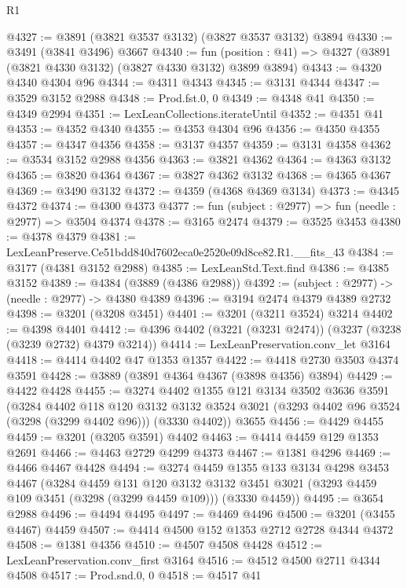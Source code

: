 \begin{lexlean}{R1}
\begin{coremodule}
@4327 := @3891 (@3821 @3537 @3132) (@3827 @3537 @3132) @3894
@4330 := @3491 (@3841 @3496) @3667
@4340 := fun (position : @41) => @4327 (@3891 (@3821 @4330 @3132) (@3827 @4330 @3132) @3899 @3894)
@4343 := @4320 @4340 @4304 @96
@4344 := @4311 @4343
@4345 := @3131 @4344
@4347 := @3529 @3152 @2988
@4348 := Prod.fst.{0, 0}
@4349 := @4348 @41
@4350 := @4349 @2994
@4351 := LexLeanCollections.iterateUntil
@4352 := @4351 @41
@4353 := @4352 @4340
@4355 := @4353 @4304 @96
@4356 := @4350 @4355
@4357 := @4347 @4356
@4358 := @3137 @4357
@4359 := @3131 @4358
@4362 := @3534 @3152 @2988 @4356
@4363 := @3821 @4362
@4364 := @4363 @3132
@4365 := @3820 @4364
@4367 := @3827 @4362 @3132
@4368 := @4365 @4367
@4369 := @3490 @3132
@4372 := @4359 (@4368 @4369 @3134)
@4373 := @4345 @4372
@4374 := @4300 @4373
@4377 := fun (subject : @2977) => fun (needle : @2977) => @3504 @4374
@4378 := @3165 @2474
@4379 := @3525 @3453
@4380 := @4378 @4379
@4381 := LexLeanPreserve.Ce51bdd840d7602eca0e2520e09d8ce82.R1.__fits_43
@4384 := @3177 (@4381 @3152 @2988)
@4385 := LexLeanStd.Text.find
@4386 := @4385 @3152
@4389 := @4384 (@3889 (@4386 @2988))
@4392 := (subject : @2977) -> (needle : @2977) -> @4380 @4389
@4396 := @3194 @2474 @4379 @4389 @2732
@4398 := @3201 (@3208 @3451)
@4401 := @3201 (@3211 @3524) @3214
@4402 := @4398 @4401
@4412 := @4396 @4402 (@3221 (@3231 @2474)) (@3237 (@3238 (@3239 @2732) @4379 @3214))
@4414 := LexLeanPreservation.conv_let @3164
@4418 := @4414 @4402 @47 @1353 @1357
@4422 := @4418 @2730 @3503 @4374 @3591
@4428 := @3889 (@3891 @4364 @4367 (@3898 @4356) @3894)
@4429 := @4422 @4428
@4455 := @3274
    @4402
    @1355
    @121
    @3134
    @3502
    @3636
    @3591
    (@3284
      @4402
      @118
      @120
      @3132
      @3132
      @3524
      @3021
      (@3293 @4402 @96 @3524 (@3298 (@3299 @4402 @96)))
      (@3330 @4402))
    @3655
@4456 := @4429 @4455
@4459 := @3201 (@3205 @3591) @4402
@4463 := @4414 @4459 @129 @1353 @2691
@4466 := @4463 @2729 @4299 @4373
@4467 := @1381 @4296
@4469 := @4466 @4467 @4428
@4494 := @3274
    @4459
    @1355
    @133
    @3134
    @4298
    @3453
    @4467
    (@3284
      @4459
      @131
      @120
      @3132
      @3132
      @3451
      @3021
      (@3293 @4459 @109 @3451 (@3298 (@3299 @4459 @109)))
      (@3330 @4459))
@4495 := @3654 @2988
@4496 := @4494 @4495
@4497 := @4469 @4496
@4500 := @3201 (@3455 @4467) @4459
@4507 := @4414 @4500 @152 @1353 @2712 @2728 @4344 @4372
@4508 := @1381 @4356
@4510 := @4507 @4508 @4428
@4512 := LexLeanPreservation.conv_first @3164
@4516 := @4512 @4500 @2711 @4344 @4508
@4517 := Prod.snd.{0, 0}
@4518 := @4517 @41

\end{coremodule}
\end{lexlean}
